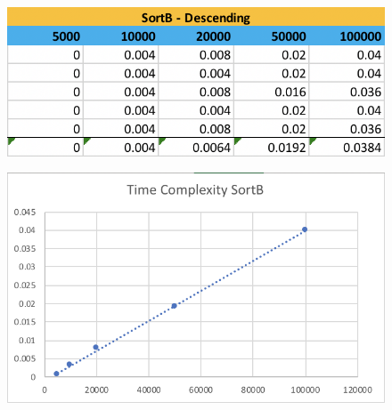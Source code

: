 \documentclass[a4paper]{article}
\begin{document}
\begin{appendices}
	\begin{figure}[h!]
	\begin{center}
	\includegraphics[width=\linewidth]{B_Re.png}
	\end{center}
	\end{figure}

	\begin{figure}[h!]
	\begin{center}
	\includegraphics[width=\linewidth]{B_TC.png}
	\end{center}
	\end{figure}





\end{appendices}
\end{document}
